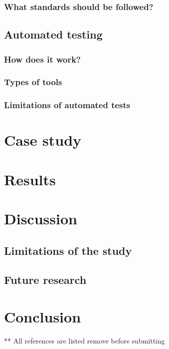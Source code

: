 \documentclass{master_thesis}
\begin{document}
		\subsubsection{What standards should be followed?}
	\subsection{Automated testing}
		\subsubsection{How does it work?}
		\subsubsection{Types of tools}
		\subsubsection{Limitations of automated tests}

\section{Case study}
\citep{byrne-harber2021}


\section{Results}
\section{Discussion}
	\subsection{Limitations of the study}
	\subsection{Future research}
\section*{Conclusion}


\printbibliography
** All references are listed remove before submitting
\end{document}
